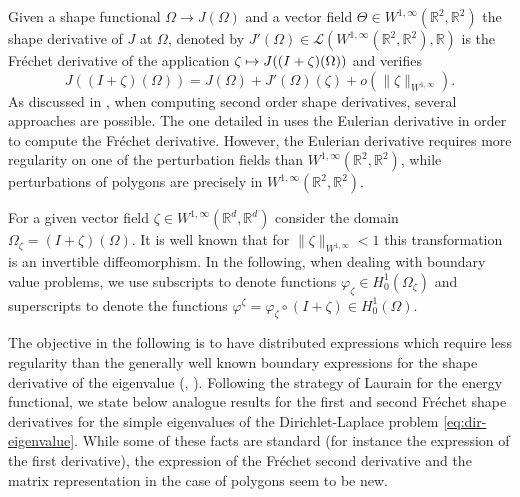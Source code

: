 \documentclass[JEP,XML,SOM,Unicode,ThmDefs,NoFloatCountersInSection,published]{cedram}
\def\mto{\mathchoice{\longmapsto}{\mapsto}{\mapsto}{\mapsto}}
\theoremstyle{plain}
\theoremstyle{definition}
\let\Bbb\mathbb
\def\R{\mathbb{R}}
\begin{document}
Given a shape functional $\Omega \to J(\Omega)$ and a vector field $\Theta \in W^{1,\infty}(\Bbb{R}^2,\Bbb{R}^2)$ the shape derivative of $J$ at $\Omega$, denoted by $J'(\Omega)\in \mathcal L(W^{1,\infty}(\Bbb{R}^2,\Bbb{R}^2), \R)$ is the Fréchet derivative of the application $\zeta \mto J((I+\zeta)(\Omega))$ and verifies
\[
J((I+\zeta)(\Omega)) = J(\Omega)+J'(\Omega)(\zeta) + o(\|\zeta\|_{W^{1,\infty}}).
\]
As discussed in \cite[\S 9.1]{laurain2ndDeriv}, when computing second order shape derivatives, several approaches are possible. The one detailed in \cite{laurain2ndDeriv} uses the Eulerian derivative in order to compute the Fréchet derivative. However, the Eulerian derivative requires more regularity on one of the perturbation fields than $ W^{1,\infty}(\Bbb{R}^2,\Bbb{R}^2)$, while perturbations of polygons are precisely in $ W^{1,\infty}(\Bbb{R}^2,\Bbb{R}^2)$.

For a given vector field $\zeta \in W^{1,\infty}(\Bbb{R}^d,\Bbb{R}^d)$ consider the domain $\Omega_\zeta = (I+\zeta)(\Omega)$. It is well known that for $\|\zeta \|_{W^{1,\infty}}<1$ this transformation is an invertible diffeomorphism. In the following, when dealing with boundary value problems, we use subscripts to denote functions $\varphi_\zeta \in H_0^1(\Omega_\zeta)$ and superscripts to denote the functions $\varphi^\zeta = \varphi_\zeta \circ (I+\zeta)\in H_0^1(\Omega)$.

The objective in the following is to have distributed expressions which require less regularity than the generally well known boundary expressions for the shape derivative of the eigenvalue (\cite{HPR04}, \cite{henrot-pierre-english}). Following the strategy of Laurain for the energy functional, we state below analogue results for the first and second Fréchet shape derivatives for the simple eigenvalues of the Dirichlet-Laplace problem \eqref{eq:dir-eigenvalue}. While some of these facts are standard (for instance the expression of the first derivative), the expression of the Fréchet second derivative and the matrix representation in the case of polygons seem to be new.
\end{document}
